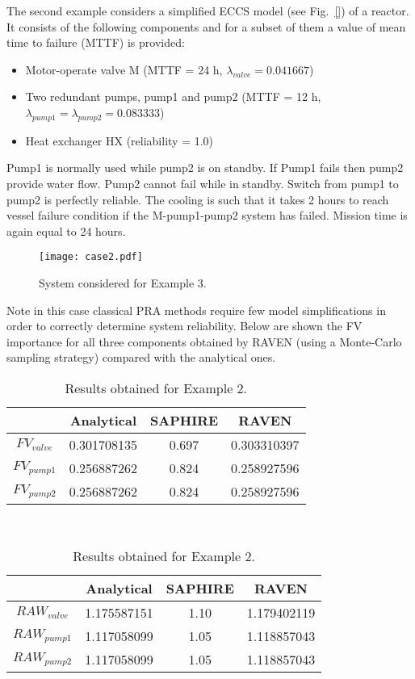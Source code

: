 The second example considers a simplified ECCS model (see Fig.~\ref{}) of a reactor. 
It consists of the following components and for a subset of them a 
value of mean time to failure (MTTF) is provided:
\begin{itemize}
  \item Motor-operate valve M (MTTF = 24 h, $\lambda_{valve} = 0.041667$)
  \item Two redundant pumps, pump1 and pump2 
        (MTTF = 12 h, $\lambda_{pump1} = \lambda_{pump2} = 0.083333$)
  \item Heat exchanger HX (reliability = 1.0)
\end{itemize}

Pump1 is normally used while pump2 is on standby. If Pump1 fails then pump2 provide water flow. 
Pump2 cannot fail while in standby. Switch from pump1 to pump2 is perfectly reliable. 
The cooling is such that it takes 2 hours to reach vessel failure condition if the 
M-pump1-pump2 
system has failed. Mission time is again equal to 24 hours.

\begin{figure}
    \centering
    \centerline{\texttt{[image: case2.pdf]}}
    \caption{System considered for Example 3.}
    \label{fig:example3}
\end{figure}

Note in this case classical PRA methods require few model simplifications in order to correctly 
determine system reliability.
Below are shown the FV importance for all three components obtained by RAVEN (using a Monte-Carlo 
sampling strategy) compared with the analytical ones.

\begin{table}
    \caption{Results obtained for Example 2.}
    \begin{minipage}{.5\linewidth}
      \centering
      \begin{tabular}{c | c | c | c} 
        \hline 
         & Analytical & SAPHIRE & RAVEN \\ 
        \hline 
        $FV_{valve}$ & 0.301708135 & 0.697 & 0.303310397 \\
        $FV_{pump1}$ & 0.256887262 & 0.824 & 0.258927596 \\
        $FV_{pump2}$ & 0.256887262 & 0.824 & 0.258927596 \\
        \hline 
      \end{tabular}
    \end{minipage} \\
    \begin{minipage}{.5\linewidth}
      \centering
      \begin{tabular}{c | c | c | c} 
        \hline 
         & Analytical & SAPHIRE & RAVEN \\ 
        \hline 
        $RAW_{valve}$ & 1.175587151 & 1.10 & 1.179402119 \\
        $RAW_{pump1}$ & 1.117058099 & 1.05 & 1.118857043 \\
        $RAW_{pump2}$ & 1.117058099 & 1.05 & 1.118857043 \\
        \hline 
      \end{tabular}
    \end{minipage} 
\end{table}


